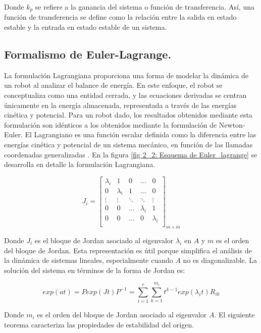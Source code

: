Donde $k_{p}$ se refiere a la ganancia del sistema o función de transferencia. Así, una función de transferencia se define como la relación entre la salida en estado estable y la entrada en estado estable de un sistema.

 
\subsection{Formalismo de Euler-Lagrange.}

La formulación Lagrangiana proporciona una forma de modelar la dinámica de un robot al analizar el balance de energía. En este enfoque, el robot se conceptualiza como una entidad cerrada, y las ecuaciones derivadas se centran únicamente en la energía almacenada, representada a través de las energías cinética y potencial. Para un robot dado, los resultados obtenidos mediante esta formulación son idénticos a los obtenidos mediante la formulación de Newton-Euler.
El Lagrangiano es una función escalar definida como la diferencia entre las energías cinética y potencial de un sistema mecánico, en función de las llamadas coordenadas generalizadas \cite{torres2002robots}. En la figura \ref{fig 2_2: Esquema de Euler_lagrange} se desarrolla en detalle la formulación Lagrangiana.


\begin{equation}
J_{i}=
    \begin{bmatrix}
        \lambda_{i} & 1           & 0      &...  & 0  \\
        0           & \lambda_{i} & 1      & ...& 0 \\
        \vdots      & \vdots      & \ddots & \ddots & \vdots \\
             0   &    0    &  ... & \lambda_{i} & 1   \\
           0 &   0   &  ...       &  0   & \lambda_{i} \\
    \end{bmatrix}_{m \times m}
\end{equation}

Donde $J_{i}$ es el bloque de Jordan asociado al eigenvalor $\lambda_{i}$  en $A$ y $m$ es el orden del bloque de Jordan. Esta representación es útil porque simplifica el análisis de la dinámica de sistemas lineales, especialmente cuando $A$ no es diagonalizable. La solución del sistema en términos de la forma de Jordan es:

\begin{equation}
     exp(at) = P exp(Jt) P^{-1} = \sum_{i=1}^{r}\sum_{k=1}^{m_{i}}t^{k-1}exp(\lambda_{i}t)R_{ik}
\end{equation}

Donde $m_{i}$ es el orden del bloque de  Jordan asociado al eigenvalor $A$. El siguiente teorema caracteriza las propiedades de estabilidad del origen.
